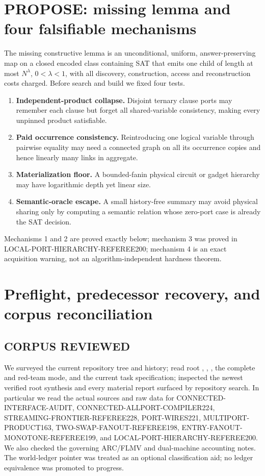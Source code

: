 \documentclass[11pt]{article}
\begin{document}
\section{PROPOSE: missing lemma and four falsifiable mechanisms}
The missing constructive lemma is an unconditional, uniform, answer-preserving
map on a closed encoded class containing SAT that emits one child of length at
most $N^\lambda$, $0<\lambda<1$, with all discovery, construction, access and
reconstruction costs charged.  Before search and build we fixed four tests.
\begin{enumerate}
\item \textbf{Independent-product collapse.}  Disjoint ternary clause ports
may remember each clause but forget all shared-variable consistency, making
every unpinned product satisfiable.
\item \textbf{Paid occurrence consistency.}  Reintroducing one logical
variable through pairwise equality may need a connected graph on all its
occurrence copies and hence linearly many links in aggregate.
\item \textbf{Materialization floor.}  A bounded-fanin physical circuit or
gadget hierarchy may have logarithmic depth yet linear size.
\item \textbf{Semantic-oracle escape.}  A small history-free summary may
avoid physical sharing only by computing a semantic relation whose zero-port
case is already the SAT decision.
\end{enumerate}
Mechanisms 1 and 2 are proved exactly below; mechanism 3 was proved in
LOCAL-PORT-HIERARCHY-REFEREE200; mechanism 4 is an exact acquisition warning,
not an algorithm-independent hardness theorem.

\section{Preflight, predecessor recovery, and corpus reconciliation}
\subsection*{CORPUS REVIEWED}
We surveyed the current repository tree and history; read root
, , , the complete
 and red-team mode, and the current
task specification; inspected the newest verified root synthesis and every
material report surfaced by repository search.  In particular we read the
actual sources and raw data for CONNECTED-INTERFACE-AUDIT,
CONNECTED-ALLPORT-COMPILER224, STREAMING-FRONTIER-REFEREE228,
PORT-WIRES221, MULTIPORT-PRODUCT163, TWO-SWAP-FANOUT-REFEREE198,
ENTRY-FANOUT-MONOTONE-REFEREE199, and
LOCAL-PORT-HIERARCHY-REFEREE200.  We also checked the governing ARC/FLMV and
dual-machine accounting notes.  The world-ledger pointer was treated as an
optional classification aid; no ledger equivalence was promoted to progress.
\end{document}
